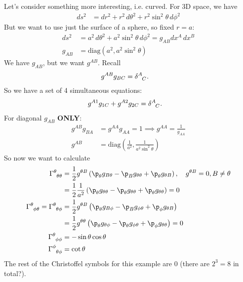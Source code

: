 \documentclass[a4paper, 11pt, normalem]{report}
\begin{document}
Let's consider something more interesting, i.e. curved. 
For 3D space, we have
\begin{align}
    ds^2 &= dr^2 + r^2\,d\theta^2 + r^2\sin^2\theta\,d\phi^2 
\end{align}
But we want to use just the surface of a sphere, so fixed $r=a$:
\begin{align}
    ds^2 &= a^2\,d\theta^2 + a^2\sin^2\theta\,d\phi^2 = g_{AB}dx^A\,dx^B \\
    g_{AB} &= \text{diag}(a^2,a^2\sin^2\theta)
\end{align}
We have $g_{AB}$, but we want $g^{AB}$. Recall
\begin{align}
    g^{AB}g_{BC} &= \tensor{\delta}{^A_C}.
\end{align}
So we have a set of 4 simultaneous equations:
\begin{align}
    g^{A1}g_{1C} + g^{A2}g_{2C} &= \tensor{\delta}{^A_C}.
\end{align}
For diagonal $g_{AB}$ \textbf{ONLY}:
\begin{align}
    g^{AB}g_{BA} &= g^{AA}g_{AA} = 1 \implies g^{AA} = \frac{1}{g_{AA}} \\
    g^{AB} &= \text{diag}\left(\frac{1}{a^2},\frac{1}{a^2\sin^2\theta}\right)
\end{align}
So now we want to calculate
\begin{align}
    \tensor{\Gamma}{^\theta_{\theta\theta}} &= \frac12 g^{\theta B} \left(\p_\theta g_{B\theta} - \p_B g_{\theta\theta} + \p_{\theta} g_{\theta B}\right), \quad g^{\theta B} = 0, B\neq\theta \\
                                            &= \frac12 \frac{1}{a^2}\left(\p_{\theta} g_{\theta\theta} - \p_\theta g_{\theta\theta} + \p_\theta g_{\theta\theta}\right) =  0 \\
    \tensor{\Gamma}{^\theta_{\phi\theta}} = \tensor{\Gamma}{^\theta_{\theta\phi}} &= \frac12 g^{\theta B}\left(\p_\theta g_{B\phi} - \p_B g_{\phi\theta} + \p_\phi g_{\theta B}\right) \\
                                          &= \frac12 g^{\theta\theta}\left(\p_\theta g_{\theta\phi} - \p_\theta g_{\phi\theta} + \p_\phi g_{\theta\theta}\right) = 0 \\
    \tensor{\Gamma}{^\theta_{\phi\phi}} &= -\sin\theta\cos\theta \\
    \tensor{\Gamma}{^\phi_{\theta\phi}} &= \cot\theta
\end{align}
The rest of the Christoffel symbols for this example are 0 (there are $2^3=8$ in total?).
\end{document}
